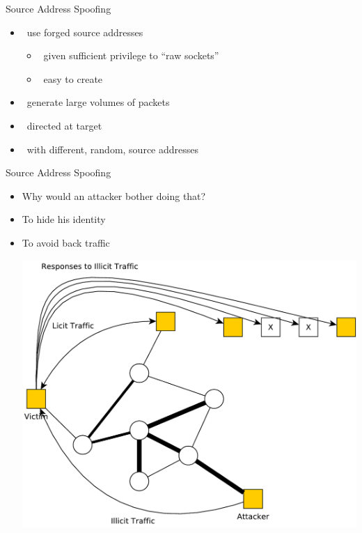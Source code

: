 \documentclass{beamer}
\begin{document}
\begin{frame}{Source Address Spoofing }
  \begin{itemize}
  \item  use forged source addresses 
    \begin{itemize}
    \item  given sufficient privilege to “raw sockets” 
    \item  easy to create 
    \end{itemize}
  \item  generate large volumes of packets 
  \item  directed at target 
  \item  with different, random, source addresses
  \end{itemize}
\end{frame}



\begin{frame}{Source Address Spoofing }
  \begin{itemize}
  \item Why would an attacker bother doing that?
  \item<2-> To hide his identity
  \item<3-> To avoid back traffic
  \begin{center}
    \includegraphics[width=0.8\linewidth]{dos2}
  \end{center}
  \end{itemize}
\end{frame}
\end{document}
